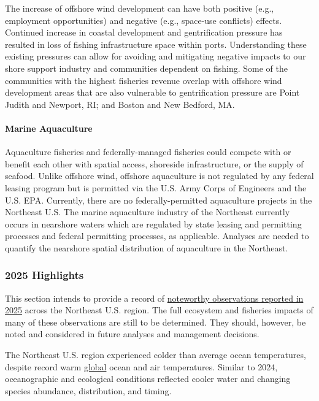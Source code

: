 \documentclass[
  10pt,
]{article}
\begin{document}
The increase of offshore wind development can have both positive (e.g., employment opportunities) and negative (e.g., space-use conflicts) effects. Continued increase in coastal development and gentrification pressure has resulted in loss of fishing infrastructure space within ports. Understanding these existing pressures can allow for avoiding and mitigating negative impacts to our shore support industry and communities dependent on fishing. Some of the communities with the highest fisheries revenue overlap with offshore wind development areas that are also vulnerable to gentrification pressure are Point Judith and Newport, RI; and Boston and New Bedford, MA.

\paragraph{Marine Aquaculture}\label{marine-aquaculture}

Aquaculture fisheries and federally-managed fisheries could compete with or benefit each other with spatial access, shoreside infrastructure, or the supply of seafood. Unlike offshore wind, offshore aquaculture is not regulated by any federal leasing program but is permitted via the U.S. Army Corps of Engineers and the U.S. EPA. Currently, there are no federally-permitted aquaculture projects in the Northeast U.S. The marine aquaculture industry of the Northeast currently occurs in nearshore waters which are regulated by state leasing and permitting processes and federal permitting processes, as applicable. Analyses are needed to quantify the nearshore spatial distribution of aquaculture in the Northeast.

\newpage

\subsubsection{2025 Highlights}\label{highlights}

This section intends to provide a record of \href{https://noaa-edab.github.io/catalog/observation_synthesis_2025.html}{noteworthy observations reported in 2025} across the Northeast U.S. region. The full ecosystem and fisheries impacts of many of these observations are still to be determined. They should, however, be noted and considered in future analyses and management decisions.

The Northeast U.S. region experienced colder than average ocean temperatures, despite record warm \href{https://www.ncei.noaa.gov/news/global-climate-202513}{global} ocean and air temperatures. Similar to 2024, oceanographic and ecological conditions reflected cooler water and changing species abundance, distribution, and timing.
\end{document}
